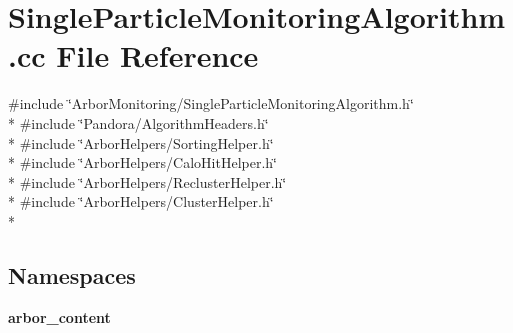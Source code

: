 \section{Single\+Particle\+Monitoring\+Algorithm.\+cc File Reference}
\label{SingleParticleMonitoringAlgorithm_8cc}
{\ttfamily \#include \char`\"{}Arbor\+Monitoring/\+Single\+Particle\+Monitoring\+Algorithm.\+h\char`\"{}}\\*
{\ttfamily \#include \char`\"{}Pandora/\+Algorithm\+Headers.\+h\char`\"{}}\\*
{\ttfamily \#include \char`\"{}Arbor\+Helpers/\+Sorting\+Helper.\+h\char`\"{}}\\*
{\ttfamily \#include \char`\"{}Arbor\+Helpers/\+Calo\+Hit\+Helper.\+h\char`\"{}}\\*
{\ttfamily \#include \char`\"{}Arbor\+Helpers/\+Recluster\+Helper.\+h\char`\"{}}\\*
{\ttfamily \#include \char`\"{}Arbor\+Helpers/\+Cluster\+Helper.\+h\char`\"{}}\\*
\subsection*{Namespaces}
\begin{DoxyCompactItemize}
\item 
 {\bf arbor\+\_\+content}
\end{DoxyCompactItemize}
